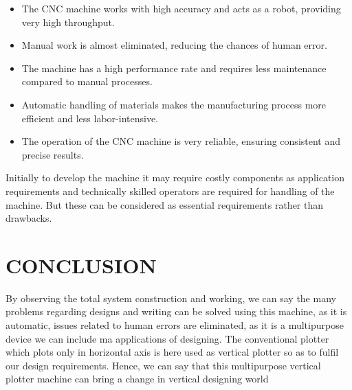 \documentclass[conference]{IEEEtran}
\begin{document}
\begin{itemize}
    \item  The CNC machine works with high accuracy and acts as a robot, providing very high throughput.
    \item  Manual work is almost eliminated, reducing the chances of human error.
    \item  The machine has a high performance rate and requires less maintenance compared to manual processes.
    \item  Automatic handling of materials makes the manufacturing process more efficient and less labor-intensive.
    \item  The operation of the CNC machine is very reliable, ensuring consistent and precise results.
\end{itemize}
\vspace{15pt}
Initially to develop the machine it may require costly
components as application requirements and technically skilled
operators are required for handling of the machine. But these
can be considered as essential requirements rather than
drawbacks.


\clearpage

\section{CONCLUSION}

\vspace{5pt}
By observing the total system construction and working, we can
say the many problems regarding designs and writing can be
solved using this machine, as it is automatic, issues related to
human errors are eliminated, as it is a multipurpose device we
can include ma applications of designing. The conventional
plotter which plots only in horizontal axis is here used as
vertical plotter so as to fulfil our design requirements. Hence,
we can say that this multipurpose vertical plotter machine can
bring a change in vertical designing world



\vspace{5pt}
\end{document}
